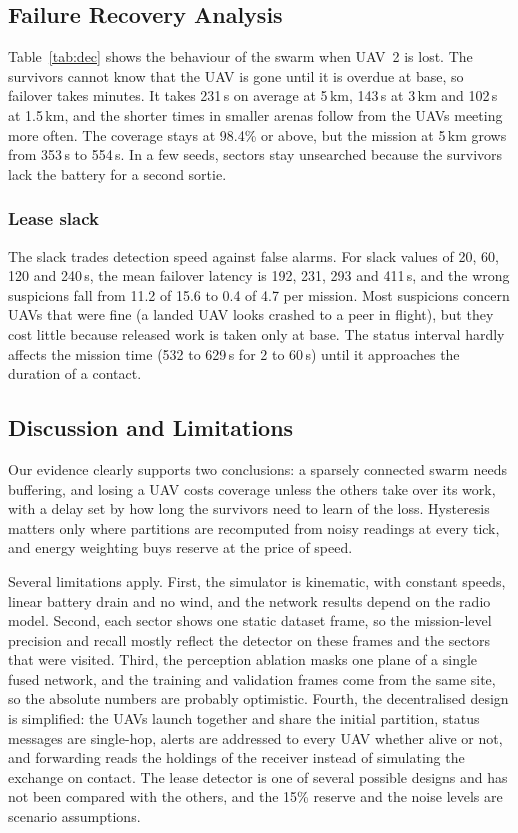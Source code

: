 \documentclass[10pt,a4paper,twocolumn]{article}
\begin{document}
\subsection{Failure Recovery Analysis}
Table~\ref{tab:dec} shows the behaviour of the swarm when UAV~2 is lost. The survivors cannot know that the UAV is gone until it is overdue at base, so failover takes minutes. It takes 231\,s on average at 5\,km, 143\,s at 3\,km and 102\,s at 1.5\,km, and the shorter times in smaller arenas follow from the UAVs meeting more often. The coverage stays at 98.4\% or above, but the mission at 5\,km grows from 353\,s to 554\,s. In a few seeds, sectors stay unsearched because the survivors lack the battery for a second sortie.



\subsubsection{Lease slack}The slack trades detection speed against false alarms. For slack values of 20, 60, 120 and 240\,s, the mean failover latency is 192, 231, 293 and 411\,s, and the wrong suspicions fall from 11.2 of 15.6 to 0.4 of 4.7 per mission. Most suspicions concern UAVs that were fine (a landed UAV looks crashed to a peer in flight), but they cost little because released work is taken only at base. The status interval hardly affects the mission time (532 to 629\,s for 2 to 60\,s) until it approaches the duration of a contact.

\subsection{Discussion and Limitations}\label{sec:disc}
Our evidence clearly supports two conclusions: a sparsely connected swarm needs buffering, and losing a UAV costs coverage unless the others take over its work, with a delay set by how long the survivors need to learn of the loss. Hysteresis matters only where partitions are recomputed from noisy readings at every tick, and energy weighting buys reserve at the price of speed.

Several limitations apply. First, the simulator is kinematic, with constant speeds, linear battery drain and no wind, and the network results depend on the radio model. Second, each sector shows one static dataset frame, so the mission-level precision and recall mostly reflect the detector on these frames and the sectors that were visited. Third, the perception ablation masks one plane of a single fused network, and the training and validation frames come from the same site, so the absolute numbers are probably optimistic. Fourth, the decentralised design is simplified: the UAVs launch together and share the initial partition, status messages are single-hop, alerts are addressed to every UAV whether alive or not, and forwarding reads the holdings of the receiver instead of simulating the exchange on contact. The lease detector is one of several possible designs and has not been compared with the others, and the 15\% reserve and the noise levels are scenario assumptions.
\end{document}
